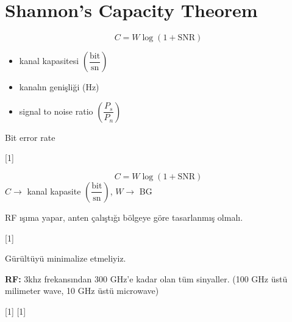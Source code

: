 \documentclass[11pt,a4paper]{article}
\begin{document}

\section{Shannon's Capacity Theorem}

\[ C = W \log(1+\mathrm{SNR}) \]
\begin{itemize}
  \item[$C$:] kanal kapasitesi $\left(\dfrac{\text{bit}}{\text{sn}}\right)$
  \item[$W$:] kanalın genişliği (Hz)
  \item[SNR:] signal to noise ratio $\left(\dfrac{P_s}{P_n}\right)$
\end{itemize}

Bit error rate

[1]

\[ C = W \log(1+\mathrm{SNR}) \]
$C \to$ kanal kapasite $\left(\dfrac{\text{bit}}{\text{sn}}\right)$, \quad $W \to$ BG

RF ışıma yapar, anten çalıştığı bölgeye göre tasarlanmış olmalı.

[1]

Gürültüyü minimalize etmeliyiz.

\textbf{RF:} 3khz frekansından 300 GHz'e kadar olan tüm sinyaller. (100 GHz üstü milimeter wave, 10 GHz üstü microwave)

[1]
[1]
\end{document}
